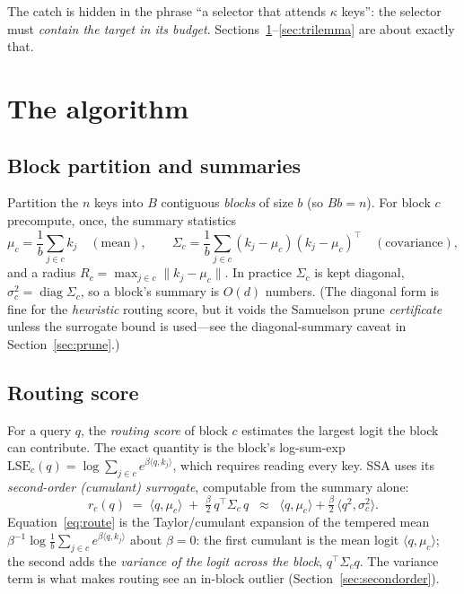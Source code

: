 \documentclass[11pt]{article}
\numberwithin{equation}{section}
\newcommand{\inner}[2]{\langle #1, #2\rangle}
\begin{document}
The catch is hidden in the phrase ``a selector that attends $\kappa$ keys'': the selector must \emph{contain
the target in its budget}. Sections~\ref{sec:algorithm}--\ref{sec:trilemma} are about exactly that.

\section{The algorithm}\label{sec:algorithm}

\subsection{Block partition and summaries}

Partition the $n$ keys into $B$ contiguous \emph{blocks} of size $b$ (so $Bb=n$). For block $c$ precompute,
once, the summary statistics
\begin{equation}\label{eq:summary}
\mu_c=\frac1b\sum_{j\in c}k_j \quad(\text{mean}),\qquad
\Sigma_c=\frac1b\sum_{j\in c}(k_j-\mu_c)(k_j-\mu_c)^\top \quad(\text{covariance}),
\end{equation}
and a radius $R_c=\max_{j\in c}\lVert k_j-\mu_c\rVert$. In practice $\Sigma_c$ is kept diagonal,
$\sigma_c^2=\operatorname{diag}\Sigma_c$, so a block's summary is $O(d)$ numbers. (The diagonal form is fine
for the \emph{heuristic} routing score, but it voids the Samuelson prune \emph{certificate} unless the
surrogate bound is used---see the diagonal-summary caveat in Section~\ref{sec:prune}.)

\subsection{Routing score}

For a query $q$, the \emph{routing score} of block $c$ estimates the largest logit the block can contribute.
The exact quantity is the block's log-sum-exp
$\mathrm{LSE}_c(q)=\log\sum_{j\in c}e^{\beta\inner{q}{k_j}}$, which requires reading every key. SSA uses its
\emph{second-order (cumulant) surrogate}, computable from the summary alone:
\begin{equation}\label{eq:route}
r_c(q) \;=\; \inner{q}{\mu_c} \;+\; \tfrac{\beta}{2}\,q^\top\Sigma_c\,q
\;\;\approx\;\; \inner{q}{\mu_c} + \tfrac{\beta}{2}\,\inner{q^2}{\sigma_c^2}.
\end{equation}
Equation~\eqref{eq:route} is the Taylor/cumulant expansion of the tempered mean
$\beta^{-1}\log\frac1b\sum_{j\in c}e^{\beta\inner{q}{k_j}}$ about $\beta=0$: the first cumulant is the mean
logit $\inner{q}{\mu_c}$; the second adds the \emph{variance of the logit across the block}, $q^\top\Sigma_c
q$. The variance term is what makes routing see an in-block outlier (Section~\ref{sec:secondorder}).
\end{document}
